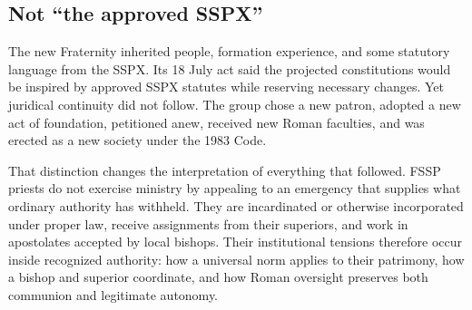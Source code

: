 \subsection{Not ``the approved SSPX''}

The new Fraternity inherited people, formation experience, and some statutory language from the SSPX. Its 18 July act said the projected constitutions would be inspired by approved SSPX statutes while reserving necessary changes. Yet juridical continuity did not follow. The group chose a new patron, adopted a new act of foundation, petitioned anew, received new Roman faculties, and was erected as a new society under the 1983 Code.

That distinction changes the interpretation of everything that followed. FSSP priests do not exercise ministry by appealing to an emergency that supplies what ordinary authority has withheld. They are incardinated or otherwise incorporated under proper law, receive assignments from their superiors, and work in apostolates accepted by local bishops. Their institutional tensions therefore occur inside recognized authority: how a universal norm applies to their patrimony, how a bishop and superior coordinate, and how Roman oversight preserves both communion and legitimate autonomy.

